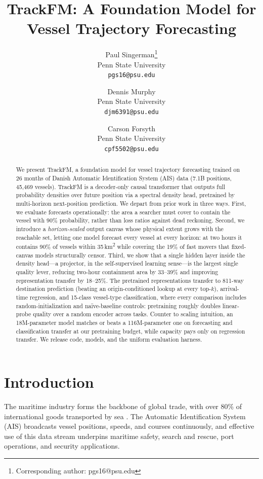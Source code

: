\documentclass{article}
\title{TrackFM: A Foundation Model for Vessel Trajectory Forecasting}
\author{
  Paul Singerman\thanks{Corresponding author: pgs16@psu.edu} \\
  Penn State University\\
  \texttt{pgs16@psu.edu}
  \and
  Dennis Murphy \\
  Penn State University\\
  \texttt{djm6391@psu.edu}
  \and
  Carson Forsyth \\
  Penn State University\\
  \texttt{cpf5502@psu.edu}
}
\date{}
\begin{document}
\maketitle

\begin{abstract}
We present TrackFM, a foundation model for vessel trajectory forecasting
trained on 26 months of Danish Automatic Identification System (AIS) data
(7.1B positions, 45{,}469 vessels). TrackFM is a decoder-only causal
transformer that outputs full probability densities over future position via
a spectral density head, pretrained by multi-horizon next-position
prediction. We depart from prior work in three ways. First, we evaluate
forecasts operationally: the area a searcher must cover to contain the
vessel with 90\% probability, rather than loss ratios against dead
reckoning. Second, we introduce a \emph{horizon-scaled} output canvas whose
physical extent grows with the reachable set, letting one model forecast
every vessel at every horizon: at two hours it contains 90\% of vessels
within 35\,km\textsuperscript{2} while covering the 19\% of fast movers
that fixed-canvas models structurally censor. Third, we show that a single
hidden layer inside the density head---a projector, in the self-supervised
learning sense---is the largest single quality lever, reducing two-hour
containment area by 33--39\% and improving representation transfer by
18--25\%. The pretrained representations transfer to
811-way destination prediction (beating an origin-conditioned lookup at
every top-$k$), arrival-time regression, and 15-class vessel-type
classification, where every comparison includes random-initialization and
na\"ive-baseline controls: pretraining roughly doubles linear-probe quality
over a random encoder across tasks. Counter to scaling intuition, an
18M-parameter model matches or beats a 116M-parameter one on forecasting
and classification transfer at our pretraining budget, while capacity pays
only on regression transfer. We release code, models, and the uniform
evaluation harness.
\end{abstract}

\section{Introduction}

The maritime industry forms the backbone of global trade, with over 80\% of
international goods transported by sea \citep{unctad2023}. The Automatic
Identification System (AIS) broadcasts vessel positions, speeds, and courses
continuously, and effective use of this data stream underpins maritime
safety, search and rescue, port operations, and security applications.
\end{document}
